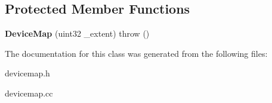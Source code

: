 \subsection*{Protected Member Functions}
\begin{DoxyCompactItemize}
\item 
\hypertarget{classDeviceMap_ae385e56171b31f2ee27d96e9623d64af}{
{\bfseries DeviceMap} (uint32 \_\-extent)  throw ()}
\label{classDeviceMap_ae385e56171b31f2ee27d96e9623d64af}

\end{DoxyCompactItemize}


The documentation for this class was generated from the following files:\begin{DoxyCompactItemize}
\item 
devicemap.h\item 
devicemap.cc\end{DoxyCompactItemize}
